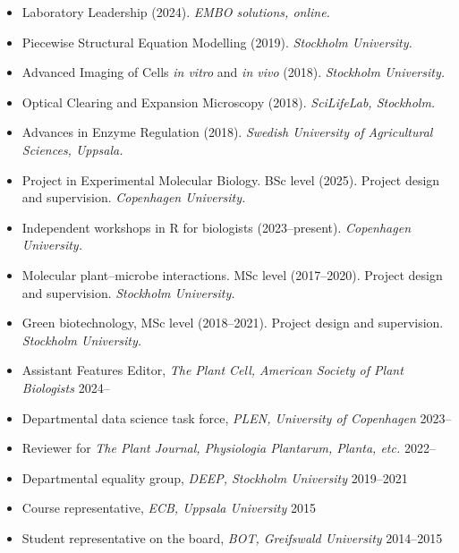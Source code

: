 \documentclass[11pt]{article}
\begin{document}
\vspace{-0.175cm}
\begin{itemize}[label={},itemindent=-9pt,leftmargin=24pt]
	\itemsep-0.1cm
	\item Laboratory Leadership (2024). \textit{EMBO solutions, online.}
	\item Piecewise Structural Equation Modelling (2019). \textit{Stockholm University.}
	\item Advanced Imaging of Cells \textit{in vitro} and \textit{in vivo} (2018). \textit{Stockholm University.} 
	\item Optical Clearing and Expansion Microscopy (2018). \textit{SciLifeLab, Stockholm.} 	
	\item Advances in Enzyme Regulation (2018). \textit{Swedish University of Agricultural Sciences, Uppsala.} 
\end{itemize}
\vspace{0.3cm}

\vspace{-0.175cm}
\begin{itemize}[label={},itemindent=-9pt,leftmargin=24pt]
	\itemsep-0.1cm
	\item Project in Experimental Molecular Biology. BSc level (2025). Project design and supervision. \textit{Copenhagen University.}
	\item Independent workshops in R for biologists (2023--present). \textit{Copenhagen University.}
	\item Molecular plant--microbe interactions. MSc level (2017--2020). Project design and supervision. \textit{Stockholm University.} 	
	\item Green biotechnology, MSc level (2018--2021). Project design and supervision. \textit{Stockholm University.} 
\end{itemize}
\vspace{0.3cm}

\vspace{-0.175cm}
\begin{itemize}[label={},itemindent=-9pt,leftmargin=24pt]
	\itemsep-0.1cm
	\item Assistant Features Editor, \textit{The Plant Cell, American Society of Plant Biologists} \hfill 2024--
	\item Departmental data science task force, \textit{PLEN, University of Copenhagen} \hfill 2023--
	\item Reviewer for \textit{The Plant Journal, Physiologia Plantarum, Planta, etc.}  \hfill 2022--
	\item Departmental equality group, \textit{DEEP, Stockholm University}  \hfill 2019--2021
	\item Course representative, \textit{ECB, Uppsala University} \hfill 2015
	\item Student representative on the board, \textit{BOT, Greifswald University} \hfill 2014--2015
\end{itemize}
\end{document}
